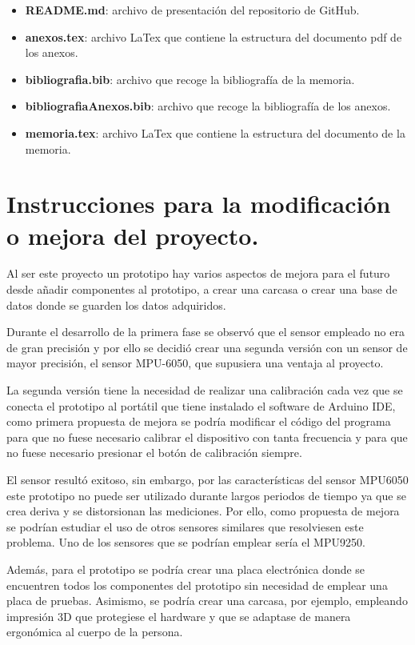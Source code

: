 \begin{itemize}
    \item \textbf{README.md}: archivo de presentación del repositorio de GitHub\cite{GitHub}.
    \item \textbf{anexos.tex}: archivo LaTex que contiene la estructura del documento pdf de los anexos.
    \item \textbf{bibliografia.bib}: archivo que recoge la bibliografía de la memoria.
    \item \textbf{bibliografiaAnexos.bib}: archivo que recoge la bibliografía de los anexos.
    \item \textbf{memoria.tex}: archivo LaTex que contiene la estructura del documento de la memoria.
\end{itemize}


\section{Instrucciones para la modificación o mejora del proyecto.}

Al ser este proyecto un prototipo hay varios aspectos de mejora para el futuro desde añadir componentes al prototipo, a crear una carcasa o crear una base de datos donde se guarden los datos adquiridos.

Durante el desarrollo de la primera fase se observó que el sensor empleado no era de gran precisión y por ello se decidió crear una segunda versión con un sensor de mayor precisión, el sensor MPU-6050\cite{MPU6050_1,MPU6050_2}, que supusiera una ventaja al proyecto. 

La segunda versión tiene la necesidad de realizar una calibración cada vez que se conecta el prototipo al portátil que tiene instalado el software de Arduino IDE\cite{ArduinoIDE}, como primera propuesta de mejora se podría modificar el código del programa para que no fuese necesario calibrar el dispositivo con tanta frecuencia y para que no fuese necesario presionar el botón de calibración siempre.

El sensor resultó exitoso, sin embargo, por las características del sensor MPU6050 este prototipo no puede ser utilizado durante largos periodos de tiempo ya que se crea deriva y se distorsionan las mediciones. Por ello, como propuesta de mejora se podrían estudiar el uso de otros sensores similares que resolviesen este problema. Uno de los sensores que se podrían emplear sería el MPU9250\cite{MPU9250_1,MPU9250_2}.

Además, para el prototipo se podría crear una placa electrónica donde se encuentren todos los componentes del prototipo sin necesidad de emplear una placa de pruebas. Asimismo, se podría crear una carcasa, por ejemplo, empleando impresión 3D que protegiese el hardware y que se adaptase de manera ergonómica al cuerpo de la persona.

